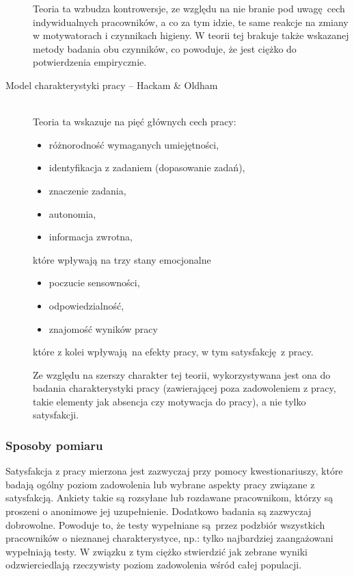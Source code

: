 \begin{description}
Teoria ta wzbudza kontrowersje, ze względu na nie branie pod uwagę cech indywidualnych pracowników, a co za tym idzie, te same reakcje na zmiany w motywatorach i czynnikach higieny. W teorii tej brakuje także wskazanej metody badania obu czynników, co powoduje, że jest ciężko do potwierdzenia empirycznie.

\item[Model charakterystyki pracy -- Hackam \& Oldham] \hfill \\
Teoria ta wskazuje na pięć głównych cech pracy:
\begin{itemize}
\item różnorodność wymaganych umiejętności,
\item identyfikacja z zadaniem (dopasowanie zadań),
\item znaczenie zadania,
\item autonomia,
\item informacja zwrotna,
\end{itemize}
które wpływają na trzy stany emocjonalne
\begin{itemize}
\item poczucie sensowności,
\item odpowiedzialność,
\item znajomość wyników pracy
\end{itemize}
które z kolei wpływają na efekty pracy, w tym satysfakcję z pracy. 

Ze względu na szerszy charakter tej teorii, wykorzystywana jest ona do badania charakterystyki pracy (zawierającej poza zadowoleniem z pracy, takie elementy jak absencja czy motywacja do pracy), a nie tylko satysfakcji.

\end{description}
\subsubsection{Sposoby pomiaru}
Satysfakcja z pracy mierzona jest zazwyczaj przy pomocy kwestionariuszy, które badają ogólny poziom zadowolenia lub wybrane aspekty pracy związane z satysfakcją. Ankiety takie są rozsyłane lub rozdawane pracownikom, którzy są proszeni o anonimowe jej uzupełnienie. Dodatkowo badania są zazwyczaj dobrowolne. Powoduje to, że testy wypełniane są przez podzbiór wszystkich pracowników o nieznanej charakterystyce, np.: tylko najbardziej zaangażowani wypełniają testy. W
związku z tym ciężko stwierdzić jak zebrane wyniki odzwierciedlają rzeczywisty poziom zadowolenia wśród całej populacji.

